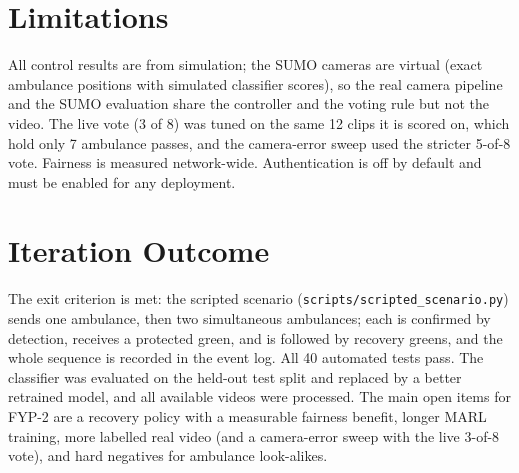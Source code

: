 \section{Limitations}
All control results are from simulation; the SUMO cameras are virtual (exact ambulance positions with
simulated classifier scores), so the real camera pipeline and the SUMO evaluation share the controller and the
voting rule but not the video. The live vote (3 of 8) was tuned on the same 12 clips it is scored on, which
hold only 7 ambulance passes, and the camera-error sweep used the stricter 5-of-8 vote. Fairness is measured
network-wide. Authentication is off by default and must be enabled for any deployment.

\section{Iteration Outcome}
The exit criterion is met: the scripted scenario (\texttt{scripts/scripted\_scenario.py}) sends one ambulance,
then two simultaneous ambulances; each is confirmed by detection, receives a protected green, and is followed
by recovery greens, and the whole sequence is recorded in the event log. All 40 automated tests pass. The classifier
was evaluated on the held-out test split and replaced by a better retrained model, and all available videos were
processed. The main open items for FYP-2 are a recovery policy with a measurable fairness benefit, longer MARL
training, more labelled real video (and a camera-error sweep with the live 3-of-8 vote), and hard negatives for
ambulance look-alikes.
